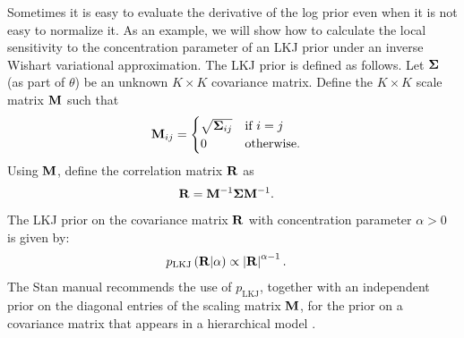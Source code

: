 \documentclass{article}\usepackage[]{graphicx}\usepackage[]{color}
\theoremstyle{definition}
\theoremstyle{plain}
\theoremstyle{plain}
\theoremstyle{plain}
\theoremstyle{definition}
\theoremstyle{plain}
\theoremstyle{plain}
\begin{document}
Sometimes it is easy to evaluate the derivative of the log prior even when it is
not easy to normalize it. As an example, we will show how to calculate the local
sensitivity to the concentration parameter of an LKJ prior
\citep{lewandowski:2009:lkj} under an inverse Wishart variational approximation.
The LKJ prior is defined as follows. Let $\boldsymbol{\Sigma}$ (as part of $\theta$) be an unknown $K\times K$
covariance matrix. Define the $K\times K$ scale matrix
$\mathbf{M}$ such that
\begin{align*}
\mathbf{M}_{ij} & =\begin{cases}
\sqrt{\boldsymbol{\Sigma}_{ij}} & \textrm{if }i=j\\
0 & \textrm{otherwise}.
\end{cases}
\end{align*}
Using $\mathbf{M}$, define the correlation matrix $\mathbf{R}$ as
\begin{align*}
\mathbf{R} & =\mathbf{M}^{-1}\boldsymbol{\Sigma}\mathbf{M}^{-1}.
\end{align*}
The LKJ prior on the covariance matrix $\mathbf{R}$ with concentration
parameter $\alpha>0$ is given by:
\begin{align*}
p_{\mathrm{LKJ}}\left(\mathbf{R}\vert\alpha\right) & \propto\left|\mathbf{R}\right|^{\alpha-1}.
\end{align*}
The Stan manual recommends the use of $p_{\mathrm{LKJ}}$, together
with an independent prior on the diagonal entries of the scaling matrix
$\mathbf{M}$, for the prior on a covariance matrix that appears in a hierarchical
model \citep[Chapter 9.13]{stan-manual:2015}.
\end{document}

